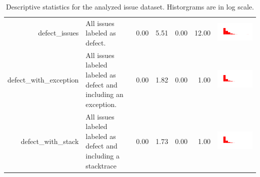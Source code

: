 \begin{table}[ht]
\begin{tabular}{rp{27em}rrrrc}
  defect\_issues & All issues labeled as defect. & 0.00 & 5.51 & 0.00 & 12.00 & \includegraphics[scale = 0.1, clip = true, trim= 50px 60px 50px 60px]{hist-5d0ab95cd3e300c21b0a40d6bec58e4c.pdf} \\ 
  defect\_with\_exception & All issues labeled labeled as defect and including an exception. & 0.00 & 1.82 & 0.00 & 1.00 & \includegraphics[scale = 0.1, clip = true, trim= 50px 60px 50px 60px]{hist-502028d1a7e2e77414e2f9f63e0bcd50.pdf} \\ 
  defect\_with\_stack & All issues labeled labeled as defect and including a stacktrace & 0.00 & 1.73 & 0.00 & 1.00 & \includegraphics[scale = 0.1, clip = true, trim= 50px 60px 50px 60px]{hist-dab0764147debd99066c84814d46d50e.pdf} \\ 
   \hline
\end{tabular}
\caption{Descriptive statistics for the analyzed issue dataset. Historgrams are in log scale.} 
\label{tab:stacktrace-stats}
\end{table}
